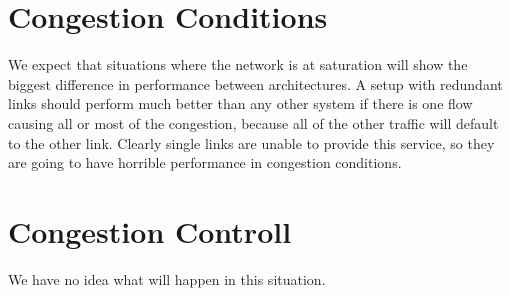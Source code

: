 \documentclass{article}
\begin{document}
\section{Congestion Conditions}
We expect that situations where the network is at saturation will show the biggest difference in performance between architectures. A setup with redundant links should perform much better than any other system if there is one flow causing all or most of the congestion, because all of the other traffic will default to the other link. Clearly single links are unable to provide this service, so they are going to have horrible performance in congestion conditions.
\section{Congestion Controll}
We have no idea what will happen in this situation.
\end{document}
